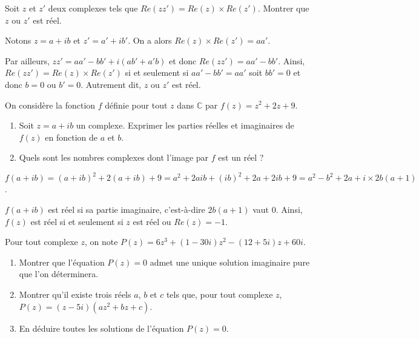 \documentclass[11pt,fleqn, openany]{book} %
\begin{document}
\begin{exercise}[topic=cpx01]Soit $z$ et $z'$ deux complexes tels que $Re(zz')=Re(z) \times Re(z')$. Montrer que $z$ ou $z'$ est réel.\end{exercise}

\begin{solution}Notons $z=a+ib$ et $z'=a'+ib'$. On a alors $Re(z) \times Re(z')=aa'$.

Par ailleurs, $zz'=aa'-bb'+i(ab'+a'b)$ et donc $Re(zz')=aa'-bb'$. Ainsi, $Re(zz')=Re(z)\times Re(z')$ si et seulement si $aa'-bb'=aa'$ soit $bb'=0$ et donc $b=0$ ou $b'=0$. Autrement dit, $z$ ou $z'$ est réel.\end{solution}

\begin{exercise}[topic=cpx01]On considère la fonction $f$ définie pour tout $z$ dans $\mathbb{C}$ par $f(z)=z^2+2z+9$.
\begin{enumerate}
\item Soit $z=a+ib$ un complexe. Exprimer les parties réelles et imaginaires de $f(z)$ en fonction de $a$ et $b$.
\item Quels sont les nombres complexes dont l'image par $f$ est un réel ?
\end{enumerate}\end{exercise}

\begin{solution}

\(f(a+ib)=(a+ib)^2+2(a+ib)+9=a^2+2aib+(ib)^2+2a+2ib+9=a^2-b^2+2a+i \times 2b(a+1)\).

\(f(a+ib)\) est réel si sa partie imaginaire, c'est-à-dire \( 2b(a+1)\) vaut 0. Ainsi, \(f(z)\) est réel si et seulement si \(z\) est réel ou \(Re(z)=-1\).
\end{solution}


\begin{exercise}[topic=cpx01]Pour tout complexe $z$, on note $P(z)=6z^3+(1-30i)z^2-(12+5i)z+60i$.
\begin{enumerate}
\item Montrer que l'équation $P(z)=0$ admet une unique solution imaginaire pure que l'on déterminera.
\item Montrer qu'il existe trois réels $a$, $b$ et $c$ tels que, pour tout complexe $z$, $P(z)=(z-5i)(az^2+bz+c)$.
\item En déduire toutes les solutions de l'équation $P(z)=0$.
\end{enumerate}\end{exercise}
\end{document}
